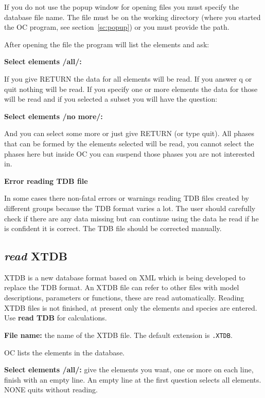 \documentclass[11pt]{article}
\begin{document}
If you do not use the popup window for opening files you must specify
the database file name.  The file must be on the working directory
(where you started the OC program, see section~\ref{sc:popup}) or you
must provide the path.

\hypertarget{Select element}{}
After opening the file the program will list the elements and ask:

{\bf Select elements /all/:}

If you give RETURN the data for all elements will be read.  If you
answer q or quit nothing will be read.  If you specify one or more
elements the data for those will be read and if you selected a subset
you will have the question:

{\bf Select elements /no more/:}

And you can select some more or just give RETURN (or type quit).  All
phases that can be formed by the elements selected will be read, you
cannot select the phases here but inside OC you can suspend those
phases you are not interested in.

\hypertarget{Read TDB error}{{\bf Error reading TDB file}}
  
In some cases there non-fatal errors or warnings reading TDB files
created by different groups because the TDB format varies a lot.  The
user should carefully check if there are any data missing but can
continue using the data he read if he is confident it is correct.  The
TDB file should be corrected manually.

\hypertarget{Read XTDB}{}
\subsection{{\em read} XTDB}\label{sc:readxtdb}

XTDB is a new database format based on XML which is being developed
to replace the TDB format.  An XTDB file can refer to other files
with model descriptions, parameters or functions, these are read
automatically.  Reading XTDB files is not finished, at present only
the elements and species are entered.  Use {\bf read TDB} for
calculations.

{\bf File name:} the name of the XTDB file.  The default extension is
{\tt .XTDB}.

OC lists the elements in the database.

{\bf Select elements /all/:} give the elements you want, one or more
on each line, finish with an empty line.  An empty line at the first
question selects all elements.  NONE quits without reading.
\end{document}
